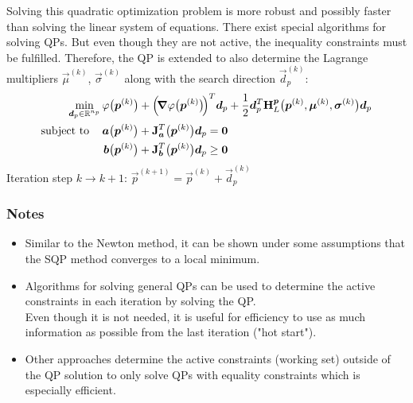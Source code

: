 				Solving this quadratic optimization problem is more robust and possibly faster than solving the linear system of equations. There exist special algorithms for solving QPs. But even though they are not active, the inequality constraints must be fulfilled. Therefore, the QP is extended to also determine the Lagrange multipliers \( \vec{\mu}^{(k)} \), \( \vec{\sigma}^{(k)} \) along with the search direction \( \vec{d}_p^{(k)} \):
				\begin{align}
					\min_{\bm{d}_p \in \mathbb{R}^{n_p}} & \, \varphi\big(\bm{p}^{(k)}\big) + \Big(\!\grad{\varphi}\big(\bm{p}^{(k)}\big)\!\Big)^T \bm{d}_p + \frac{1}{2} \bm{d}_p^T \bm{\mathrm{H}}_L^{\bm{p}}\big(\bm{p}^{(k)}, \bm{\mu}^{(k)}, \bm{\sigma}^{(k)}\big) \bm{d}_p \\
					\mathrm{subject~to}\quad      & \,
					\begin{alignedat}[t]{2}
						\bm{a}\big(\bm{p}^{(k)}\big) + \bm{\mathrm{J}}_{\bm{a}}^T\big(\bm{p}^{(k)}\big) \bm{d}_p &= \bm{0} \\
						\bm{b}\big(\bm{p}^{(k)}\big) + \bm{\mathrm{J}}_{\bm{b}}^T\big(\bm{p}^{(k)}\big) \bm{d}_p & \geq \bm{0}
					\end{alignedat}  \label{eq:qp}
				\end{align}
				Iteration step \( k \to k + 1 \): \( \vec{p}^{(k + 1)} = \vec{p}^{(k)} + \vec{d}_p^{(k)} \)

			\subsubsection{Notes}
				\begin{itemize}
					\item Similar to the Newton method, it can be shown under some assumptions that the SQP method converges to a local minimum.
					\item Algorithms for solving general QPs can be used to determine the active constraints in each iteration by solving the QP. \\ Even though it is not needed, it is useful for efficiency to use as much information as possible from the last iteration ("hot start").
					\item Other approaches determine the active constraints (working set) outside of the QP solution to only solve QPs with equality constraints which is especially efficient.
				\end{itemize}

